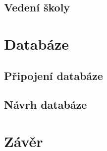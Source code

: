 \documentclass[a4paper, 12pt]{report}
\begin{document}
	\section{Vedení školy}

	\chapter{Databáze} \label{Databaze}
	\section{Připojení databáze}
	\section{Návrh databáze}
	\chapter{Závěr}

	\seznamTabulek
	
	\seznamObrazku

	\renewcommand\listoflistingscaption{Seznam zdrojových kódů}
	\listoflistings
	

	
	

\end{document}
